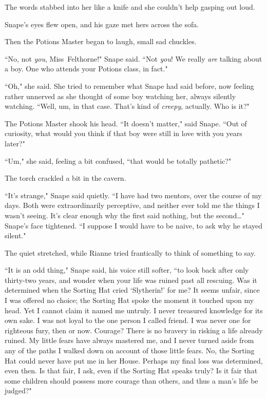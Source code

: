 The words stabbed into her like a knife and she couldn't help gasping out loud.

Snape's eyes flew open, and his gaze met hers across the sofa.

Then the Potions Master began to laugh, small sad chuckles.

``No, not \emph{you}, Miss~Felthorne!" Snape said. ``Not \emph{you}! We really \emph{are} talking about a boy. One who attends your Potions class, in fact."

``Oh," she said. She tried to remember what Snape had said before, now feeling rather unnerved as she thought of some boy watching her, always silently watching. ``Well, um, in that case. That's kind of \emph{creepy}, actually. Who is it?"

The Potions Master shook his head. ``It doesn't matter," said Snape. ``Out of curiosity, what would you think if that boy were still in love with you years later?"

``Um," she said, feeling a bit confused, ``that would be totally pathetic?"

The torch crackled a bit in the cavern.

``It's strange," Snape said quietly. ``I have had two mentors, over the course of my days. Both were extraordinarily perceptive, and neither ever told me the things I wasn't seeing. It's clear enough why the first said nothing, but the second{\ldots}" Snape's face tightened. ``I suppose I would have to be naive, to ask why he stayed silent."

The quiet stretched, while Rianne tried frantically to think of something to say.

``It is an odd thing," Snape said, his voice still softer, ``to look back after only thirty-two years, and wonder when your life was ruined past all rescuing. Was it determined when the Sorting Hat cried `Slytherin!' for me? It seems unfair, since I was offered no choice; the Sorting Hat spoke the moment it touched upon my head. Yet I cannot claim it named me untruly. I never treasured knowledge for its own sake. I was not loyal to the one person I called friend. I was never one for righteous fury, then or now. Courage? There is no bravery in risking a life already ruined. My little fears have always mastered me, and I never turned aside from any of the paths I walked down on account of those little fears. No, the Sorting Hat could never have put me in her House. Perhaps my final loss was determined, even then. Is that fair, I ask, even if the Sorting Hat speaks truly? Is it fair that some children should possess more courage than others, and thus a man's life be judged?"

